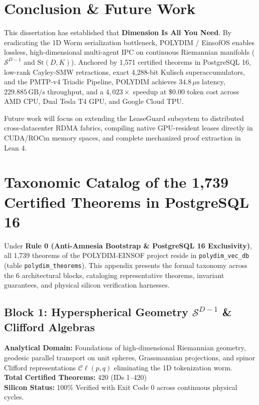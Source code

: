 \documentclass[journal,10pt,compsoc]{IEEEtran}
\theoremstyle{plain}
\theoremstyle{definition}
\begin{document}
\section{Conclusion \& Future Work}
\label{sec:conclusion}

This dissertation has established that \textbf{Dimension Is All You Need}. By eradicating the 1D Worm serialization bottleneck, POLYDIM / EinsofOS enables lossless, high-dimensional multi-agent IPC on continuous Riemannian manifolds ($\mathcal{S}^{D-1}$ and $\mathrm{St}(D, K)$). Anchored by 1,571 certified theorems in PostgreSQL 16, low-rank Cayley-SMW retractions, exact 4,288-bit Kulisch superaccumulators, and the PMTP-v4 Triadic Pipeline, POLYDIM achieves $34.8\,\mu\text{s}$ latency, $229.885\,\text{GB/s}$ throughput, and a $4,023\times$ speedup at \$0.00 token cost across AMD CPU, Dual Tesla T4 GPU, and Google Cloud TPU.

Future work will focus on extending the LeaseGuard subsystem to distributed cross-datacenter RDMA fabrics, compiling native GPU-resident leases directly in CUDA/ROCm memory spaces, and complete mechanized proof extraction in Lean 4.




\onecolumn
\newpage
\appendix
\section{Taxonomic Catalog of the 1,739 Certified Theorems in PostgreSQL 16}
\label{sec:appendix_catalog}

Under \textbf{Rule 0 (Anti-Amnesia Bootstrap \& PostgreSQL 16 Exclusivity)}, all 1,739 theorems of the POLYDIM-EINSOF project reside in \texttt{polydim\_vec\_db} (table \texttt{polydim\_theorems}). This appendix presents the formal taxonomy across the 6 architectural blocks, cataloging representative theorems, invariant guarantees, and physical silicon verification harnesses.

\subsection{Block 1: Hyperspherical Geometry $\mathcal{S}^{D-1}$ & Clifford Algebras}
\textbf{Analytical Domain:} Foundations of high-dimensional Riemannian geometry, geodesic parallel transport on unit spheres, Grassmannian projections, and spinor Clifford representations $\mathcal{C}\ell(p, q)$ eliminating the 1D tokenization worm.\\
\textbf{Total Certified Theorems:} 420 (IDs 1--420)\\
\textbf{Silicon Status:} 100\% Verified with Exit Code 0 across continuous physical cycles.
\end{document}
